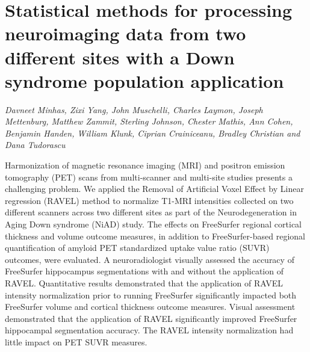 \documentclass[../booklet.tex]{subfiles}
\begin{document}
\section[Statistical methods for processing neuroimaging data from two different sites with a Down syndrome population application. {\it Davneet Minhas, Zixi Yang, John Muschelli, Charles Laymon, Joseph Mettenburg, Matthew Zammit, Sterling Johnson, Chester Mathis, Ann Cohen, Benjamin Handen, William Klunk, Ciprian Crainiceanu, Bradley Christian and Dana Tudorascu}]{Statistical methods for processing neuroimaging data from two different sites with a Down syndrome population application}
             

\begin{center}
  {\it Davneet Minhas, Zixi Yang, John Muschelli, Charles Laymon, Joseph Mettenburg, Matthew Zammit, Sterling Johnson, Chester Mathis, Ann Cohen, Benjamin Handen, William Klunk, Ciprian Crainiceanu, Bradley Christian and Dana Tudorascu}
\end{center}

\vskip 0.8cm

Harmonization of magnetic resonance imaging (MRI) and positron emission tomography (PET) scans from multi-scanner and multi-site studies presents a challenging problem. We applied the Removal of Artificial Voxel Effect by Linear regression (RAVEL) method to normalize T1-MRI intensities collected on two different scanners across two different sites as part of the Neurodegeneration in Aging Down syndrome (NiAD) study. The effects on FreeSurfer regional cortical thickness and volume outcome measures, in addition to FreeSurfer-based regional quantification of amyloid PET standardized uptake value ratio (SUVR) outcomes, were evaluated. A neuroradiologist visually assessed the accuracy of FreeSurfer hippocampus segmentations with and without the application of RAVEL. Quantitative results demonstrated that the application of RAVEL intensity normalization prior to running FreeSurfer significantly impacted both FreeSurfer volume and cortical thickness outcome measures. Visual assessment demonstrated that the application of RAVEL significantly improved FreeSurfer hippocampal segmentation accuracy. The RAVEL intensity normalization had little impact on PET SUVR measures.

\end{document}
